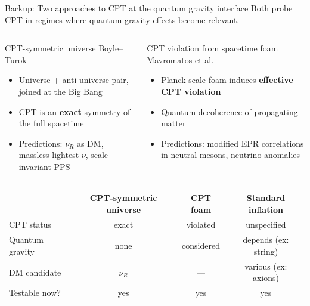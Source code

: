 \documentclass[aspectratio=169]{beamer}
\newcommand{\Blue}[1]{{\color{cptblue}#1}}
\newcommand{\Green}[1]{{\color{cptgreen}#1}}
\begin{document}
\appendix

\begin{frame}[noframenumbering]{Backup: Two approaches to CPT at the quantum gravity interface}
  \vspace{0.2em}
  {\small Both probe CPT in regimes where quantum gravity effects become relevant.}
  \vspace{0.4em}

  \begin{columns}[T]
      \begin{block}{\Blue{CPT-symmetric universe} \hfill {\scriptsize Boyle--Turok}}
        \begin{itemize}\small
          \item Universe + anti-universe pair, joined at the Big Bang
          \item CPT is an \textbf{exact} symmetry of the full spacetime
          \item Predictions: $\nu_R$ as DM, massless lightest $\nu$,
                scale-invariant PPS
        \end{itemize}
      \end{block}
      \begin{block}{\Blue{CPT violation from spacetime foam} \hfill {\scriptsize Mavromatos et al.}}
        \begin{itemize}\small
          \item Planck-scale foam induces \textbf{effective CPT violation}
          \item Quantum decoherence of propagating matter
          \item Predictions: modified EPR correlations in neutral
                mesons, neutrino anomalies
        \end{itemize}
      \end{block}
  \end{columns}

  \vspace{0.5em}
  \begin{center}
  \small
  \begin{tabular}{lccc}
    \toprule
    & CPT-symmetric universe & CPT foam & Standard inflation \\
    \midrule
    CPT status        & exact                   & violated & unspecified \\
    Quantum gravity & none     & considered     & depends (ex: string) \\
    DM candidate      & $\nu_R$                 & ---      & various (ex: axions)    \\
    Testable now?     & \Green{yes}             & \Green{yes} & \Green{yes} \\
    \bottomrule
  \end{tabular}
  \end{center}
\end{frame}
\end{document}
